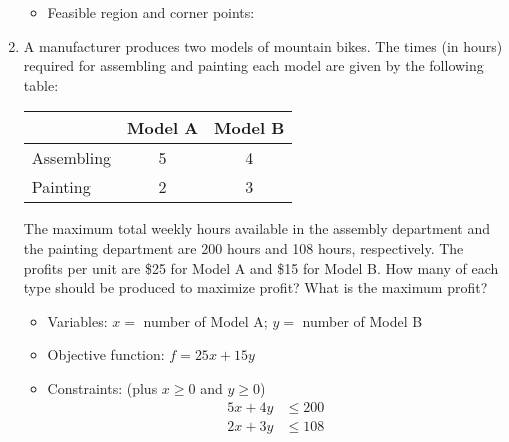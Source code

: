 \begin{enumerate}
\begin{itemize}
\item Feasible region and corner points:
\begin{center}
\end{center}
\end{itemize}\text{} 


\item A manufacturer produces two models of mountain bikes.  The times (in hours) required for assembling and painting each model are given by the following table:
\begin{center}
\begin{tabular}{|l|c|c|}
\hline
& Model A & Model B\\
\hline
Assembling & 5 & 4\\
\hline
Painting & 2 & 3\\
\hline
\end{tabular}
\end{center}
The maximum total weekly hours available in the assembly department and the painting department are 200 hours and 108 hours, respectively.  The profits per unit are \$25 for Model A and \$15 for Model B.  How many of each type should be produced to maximize profit?  What is the maximum profit?
\begin{itemize}
\item Variables: $x=$ number of Model A; $y=$ number of Model B
\item Objective function: $f = 25x + 15y$
\item Constraints: (plus $x \geq 0$ and $y \geq 0$)
\begin{align*}
5x + 4y &\leq 200\\
2x + 3y &\leq 108
\end{align*}


\end{itemize}
\end{enumerate}
